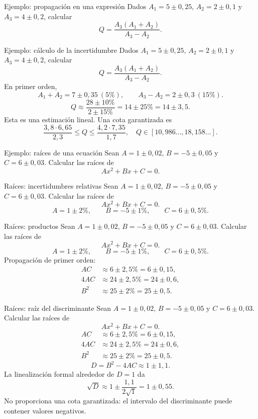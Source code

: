 \documentclass[main.tex]{subfiles}
\begin{document}
\begin{frame}{Ejemplo: propagación en una expresión}
Dados $A_1=5\pm0{,}25$, $A_2=2\pm0{,}1$ y $A_3=4\pm0{,}2$, calcular\[Q=\frac{A_3(A_1+A_2)}{A_3-A_2}.\]
\end{frame}

\begin{frame}{Ejemplo: cálculo de la incertidumbre}
\small Dados $A_1=5\pm0{,}25$, $A_2=2\pm0{,}1$ y $A_3=4\pm0{,}2$, calcular\[Q=\frac{A_3(A_1+A_2)}{A_3-A_2}.\]En primer orden,\[A_1+A_2=7\pm0{,}35\ (5\%),\qquad A_3-A_2=2\pm0{,}3\ (15\%).\]\[Q\approx\frac{28\pm10\%}{2\pm15\%}=14\pm25\%=14\pm3{,}5.\]Esta es una estimación lineal. Una cota garantizada es\[\frac{3{,}8\cdot6{,}65}{2{,}3}\le Q\le\frac{4{,}2\cdot7{,}35}{1{,}7},\quad Q\in[10{,}986\ldots,18{,}158\ldots].\]
\end{frame}

\begin{frame}{Ejemplo: raíces de una ecuación}
Sean $A=1\pm0{,}02$, $B=-5\pm0{,}05$ y $C=6\pm0{,}03$. Calcular las raíces de\[Ax^2+Bx+C=0.\]
\end{frame}

\begin{frame}{Raíces: incertidumbres relativas}
Sean $A=1\pm0{,}02$, $B=-5\pm0{,}05$ y $C=6\pm0{,}03$. Calcular las raíces de\[Ax^2+Bx+C=0.\]\[A=1\pm2\%,\qquad B=-5\pm1\%,\qquad C=6\pm0{,}5\%.\]
\end{frame}

\begin{frame}{Raíces: productos}
\small Sean $A=1\pm0{,}02$, $B=-5\pm0{,}05$ y $C=6\pm0{,}03$. Calcular las raíces de\[Ax^2+Bx+C=0.\]\[A=1\pm2\%,\qquad B=-5\pm1\%,\qquad C=6\pm0{,}5\%.\]Propagación de primer orden:\begin{align*}AC&\approx6\pm2{,}5\%=6\pm0{,}15,\\4AC&\approx24\pm2{,}5\%=24\pm0{,}6,\\B^2&\approx25\pm2\%=25\pm0{,}5.\end{align*}
\end{frame}

\begin{frame}{Raíces: raíz del discriminante}
\small Sean $A=1\pm0{,}02$, $B=-5\pm0{,}05$ y $C=6\pm0{,}03$. Calcular las raíces de\[Ax^2+Bx+C=0.\]\begin{align*}AC&\approx6\pm2{,}5\%=6\pm0{,}15,\\4AC&\approx24\pm2{,}5\%=24\pm0{,}6,\\B^2&\approx25\pm2\%=25\pm0{,}5.\end{align*}\[D=B^2-4AC\approx1\pm1{,}1.\]La linealización formal alrededor de $D=1$ da\[\sqrt D\approx1\pm\frac{1{,}1}{2\sqrt1}=1\pm0{,}55.\]No proporciona una cota garantizada: el intervalo del discriminante puede contener valores negativos.
\end{frame}
\end{document}
